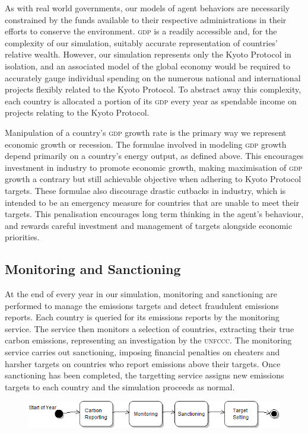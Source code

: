 As with real world governments, our models of agent behaviors are necessarily constrained by the funds available to their respective administrations in their efforts to conserve the environment. \textsc{gdp} is a readily accessible and, for the complexity of our simulation, suitably accurate representation of countries' relative wealth. However, our simulation represents only the Kyoto Protocol in isolation, and an associated model of the global economy would be required to accurately gauge individual spending on the numerous national and international projects flexibly related to the Kyoto Protocol. To abstract away this complexity, each country is allocated a portion of its \textsc{gdp} every year as spendable income on projects relating to the Kyoto Protocol.

Manipulation of a country's \textsc{gdp} growth rate is the primary way we represent economic growth or recession. The formulae involved in modeling \textsc{gdp} growth depend primarily on a country's energy output, as defined above. This encourages investment in industry to promote economic growth, making maximisation of \textsc{gdp} growth a contrary but still achievable objective when adhering to Kyoto Protocol targets. These formulae also discourage drastic cutbacks in industry, which is intended to be an emergency measure for countries that are unable to meet their targets. This penalisation encourages long term thinking in the agent's behaviour, and rewards careful investment and management of targets alongside economic priorities.

\subsection{Monitoring and Sanctioning}
At the end of every year in our simulation, monitoring and sanctioning are performed to manage the emissions targets and detect fraudulent emissions reports. Each country is queried for its emissions reports by the monitoring service. The service then monitors a selection of countries, extracting their true carbon emissions, representing an investigation by the \textsc{unfccc}. The monitoring service carries out sanctioning, imposing financial penalties on cheaters and harsher targets on countries who report emissions above their targets. Once sanctioning has been completed, the targetting service assigns new emissions targets to each country and the simulation proceeds as normal.

\begin{figure}[h!]
	\centering
	\includegraphics[width=\textwidth]{img/Kyoto_4_states.png}
	\caption{}
	\label{fig:kyoto_4_states}
\end{figure}

